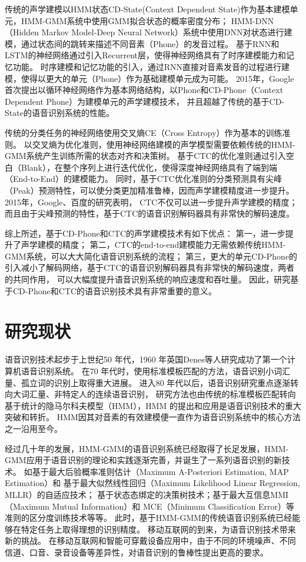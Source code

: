 传统的声学建模以HMM状态CD-State(Context Dependent State)作为基本建模单元，HMM-GMM系统中使用GMM拟合状态的概率密度分布；
HMM-DNN（Hidden Markov Model-Deep Neural Network）系统中使用DNN对状态进行建模，通过状态间的跳转来描述不同音素（Phone）的发音过程。
基于RNN和LSTM的神经网络通过引入Recurrent层，使得神经网络具有了时序建模能力和记忆功能。
时序建模和记忆功能的引入，通过RNN直接对音素发音的过程进行建模，使得以更大的单元（Phone）作为基础建模单元成为可能。
2015年，Google首次提出以循环神经网络作为基本网络结构，以Phone和CD-Phone（Context Dependent Phone）为建模单元的声学建模技术，
并且超越了传统的基于CD-State的语音识别系统的性能。

传统的分类任务的神经网络使用交叉熵CE（Cross Entropy）作为基本的训练准则。
以交叉熵为优化准则，使用神经网络建模的声学模型需要依赖传统的HMM-GMM系统产生训练所需的状态对齐和决策树。
基于CTC的优化准则通过引入空白（Blank），在整个序列上进行迭代优化，使得深度神经网络具有了端到端（End-to-End）的建模能力。
同时，基于CTC优化准则的分类预测具有尖峰（Peak）预测特性，可以使分类更加精准鲁棒，因而声学建模精度进一步提升。
2015年，Google、百度的研究表明，
CTC不仅可以进一步提升声学建模的精度；而且由于尖峰预测的特性，基于CTC的语音识别解码器具有非常快的解码速度。

综上所述，基于CD-Phone和CTC的声学建模技术有如下优点：
第一，进一步提升了声学建模的精度；
第二，CTC的end-to-end建模能力无需依赖传统HMM-GMM系统，可以大大简化语音识别系统的流程；
第三，更大的单元CD-Phone的引入减小了解码网络，基于CTC的语音识别解码器具有非常快的解码速度，两者的共同作用，
可以大幅度提升语音识别系统的响应速度和吞吐量。
因此，研究基于CD-Phone和CTC的语音识别技术具有非常重要的意义。

\section{研究现状}

语音识别技术起步于上世纪50 年代，1960 年英国Denes等人研究成功了第一个计算机语音识别系统。
在70 年代时，使用标准模板匹配的方法，语音识别小词汇量、孤立词的识别上取得重大进展。
进入80 年代以后，语音识别研究重点逐渐转向大词汇量、非特定人的连续语音识别，
研究方法也由传统的标准模板匹配转向基于统计的隐马尔科夫模型（HMM），HMM 的提出和应用是语音识别技术的重大突破和转折。
HMM因其对音素的有效建模便一直作为语音识别系统中的核心方法之一沿用至今。

经过几十年的发展，HMM-GMM的语音识别系统已经取得了长足发展，HMM-GMM应用于语音识别的理论和实践逐渐完善，并诞生了一系列语音识别的新技术。
如基于最大后验概率准则估计（Maximum A-Posteriori Estimation, MAP Estimation）和
基于最大似然线性回归（Maximum Likelihood Linear Regression, MLLR）的自适应技术；
基于状态态绑定的决策树技术；基于最大互信息MMI（Maximum Mutual Information）和
MCE（Minimum Classification Error）等准则的区分度训练技术等等。
此时，基于HMM-GMM的传统语音识别系统已经能够在特定任务上取得理想的识别精度。
移动互联网的到来，为语音识别技术带来新的挑战。
在移动互联网和智能可穿戴设备应用中，由于不同的环境噪声、不同信道、口音、录音设备等差异性，对语音识别的鲁棒性提出更高的要求。

